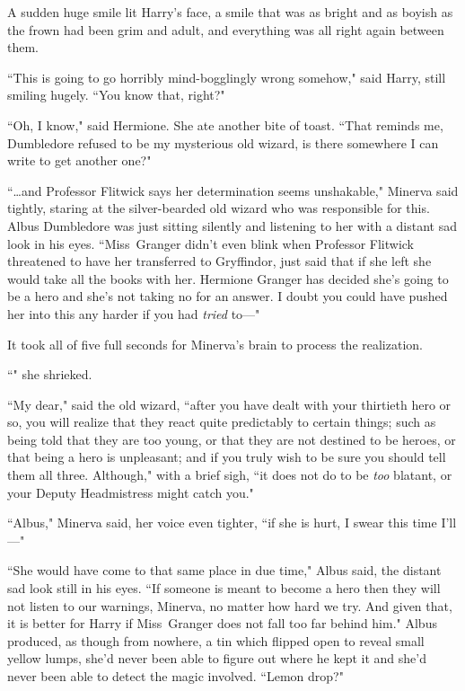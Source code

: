 A sudden huge smile lit Harry's face, a smile that was as bright and as boyish as the frown had been grim and adult, and everything was all right again between them.

``This is going to go horribly mind-bogglingly wrong somehow," said Harry, still smiling hugely. ``You know that, right?"

``Oh, I know," said Hermione. She ate another bite of toast. ``That reminds me, Dumbledore refused to be my mysterious old wizard, is there somewhere I can write to get another one?"


``{\ldots}and Professor Flitwick says her determination seems unshakable," Minerva said tightly, staring at the silver-bearded old wizard who was responsible for this. Albus Dumbledore was just sitting silently and listening to her with a distant sad look in his eyes. ``Miss~Granger didn't even blink when Professor Flitwick threatened to have her transferred to Gryffindor, just said that if she left she would take all the books with her. Hermione Granger has decided she's going to be a hero and she's not taking no for an answer. I doubt you could have pushed her into this any harder if you had \emph{tried} to---"

It took all of five full seconds for Minerva's brain to process the realization.

``" she shrieked.

``My dear," said the old wizard, ``after you have dealt with your thirtieth hero or so, you will realize that they react quite predictably to certain things; such as being told that they are too young, or that they are not destined to be heroes, or that being a hero is unpleasant; and if you truly wish to be sure you should tell them all three. Although," with a brief sigh, ``it does not do to be \emph{too} blatant, or your Deputy Headmistress might catch you."

``Albus," Minerva said, her voice even tighter, ``if she is hurt, I swear this time I'll---"

``She would have come to that same place in due time," Albus said, the distant sad look still in his eyes. ``If someone is meant to become a hero then they will not listen to our warnings, Minerva, no matter how hard we try. And given that, it is better for Harry if Miss~Granger does not fall too far behind him." Albus produced, as though from nowhere, a tin which flipped open to reveal small yellow lumps, she'd never been able to figure out where he kept it and she'd never been able to detect the magic involved. ``Lemon drop?"

